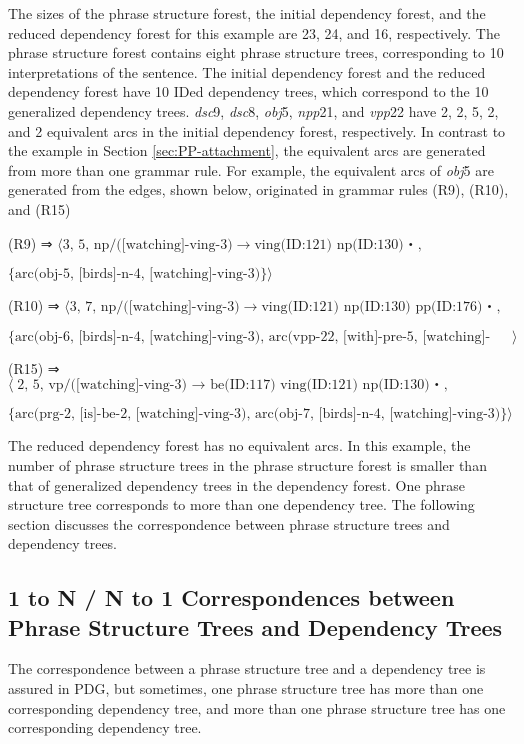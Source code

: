 \documentclass[english]{jnlp_1.4_rep}
\theoremstyle{break}
\theoremstyle{plain}
\theoremstyle{plain}
\begin{document}
The sizes of the phrase structure forest, the initial dependency
forest, and the reduced dependency forest for this example are 23, 24,
and 16, respectively. The phrase structure forest contains eight
phrase structure trees, corresponding to 10 interpretations of the
sentence. The initial dependency forest and the reduced dependency
forest have 10 IDed dependency trees, which correspond to the 10
generalized dependency trees. \textit{dsc}9, \textit{dsc}8, \textit{obj}5, \textit{npp}21, and
\textit{vpp}22 have 2, 2, 5, 2, and 2 equivalent arcs in the initial
dependency forest, respectively. In contrast to the example in Section
\ref{sec:PP-attachment}, the equivalent arcs are generated from more
than one grammar rule. For example, the equivalent arcs of \textit{obj}5 are
generated from the edges, shown below, originated in grammar rules
(R9), (R10), and (R15)

(R9) ⇒ $\langle \text{3, 5, np/([watching]-ving-3)} \rightarrow \text{ving(ID:121) np(ID:130)・, }$

\quad $\text{\{arc(obj-5, [birds]-n-4, [watching]-ving-3)\}}\rangle$

(R10) ⇒ $\langle \text{3, 7, np/([watching]-ving-3)} \rightarrow \text{ving(ID:121) np(ID:130) pp(ID:176)・, }$

\quad $\text{\{arc(obj-6, [birds]-n-4, [watching]-ving-3), arc(vpp-22, [with]-pre-5, [watching]-ving-3)\}}\rangle$

(R15) ⇒ $\langle\text{2, 5, vp/([watching]-ving-3) $\rightarrow$ be(ID:117) ving(ID:121) np(ID:130)・, }$

\quad $\text{\{arc(prg-2, [is]-be-2, [watching]-ving-3), arc(obj-7, [birds]-n-4, [watching]-ving-3)\}}\rangle$

\noindent
The reduced dependency forest has no equivalent arcs. In
this example, the number of phrase structure trees in the phrase
structure forest is smaller than that of generalized dependency trees
in the dependency forest. One phrase structure tree corresponds to
more than one dependency tree. The following section discusses the
correspondence between phrase structure trees and dependency trees.


\subsection{1 to N / N to 1 Correspondences between Phrase Structure Trees and Dependency Trees}

The correspondence between a phrase structure tree and a dependency
tree is assured in PDG, but sometimes, one phrase structure tree has
more than one corresponding dependency tree, and more than one phrase
structure tree has one corresponding dependency tree.
\end{document}
